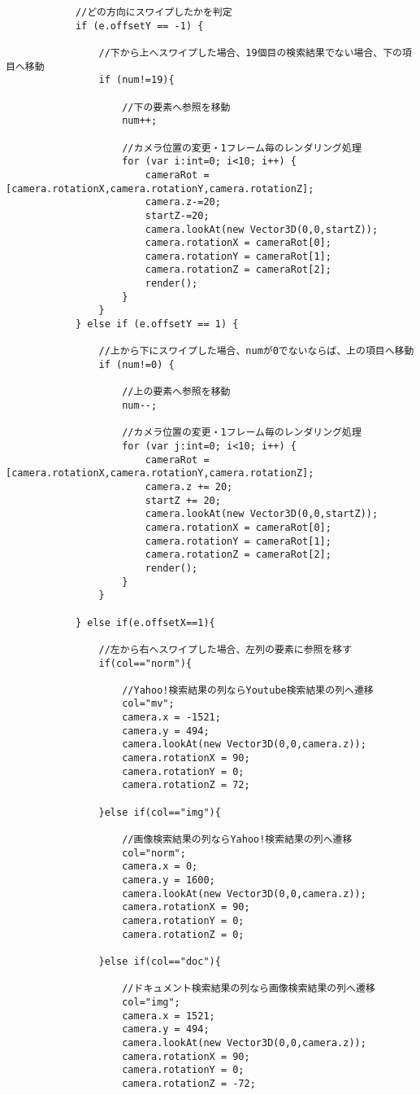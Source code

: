 {\begin{verbatim}
			//どの方向にスワイプしたかを判定
			if (e.offsetY == -1) {
				
				//下から上へスワイプした場合、19個目の検索結果でない場合、下の項目へ移動
				if (num!=19){
					
					//下の要素へ参照を移動
					num++;
					
					//カメラ位置の変更・1フレーム毎のレンダリング処理
					for (var i:int=0; i<10; i++) {
						cameraRot = [camera.rotationX,camera.rotationY,camera.rotationZ];
						camera.z-=20;
						startZ-=20;
						camera.lookAt(new Vector3D(0,0,startZ));
						camera.rotationX = cameraRot[0];
						camera.rotationY = cameraRot[1];
						camera.rotationZ = cameraRot[2];
						render();
					}
				}
			} else if (e.offsetY == 1) {
				
				//上から下にスワイプした場合、numが0でないならば、上の項目へ移動
				if (num!=0) {
					
					//上の要素へ参照を移動
					num--;
					
					//カメラ位置の変更・1フレーム毎のレンダリング処理
					for (var j:int=0; i<10; i++) {
						cameraRot = [camera.rotationX,camera.rotationY,camera.rotationZ];
						camera.z += 20;
						startZ += 20;
						camera.lookAt(new Vector3D(0,0,startZ));
						camera.rotationX = cameraRot[0];
						camera.rotationY = cameraRot[1];
						camera.rotationZ = cameraRot[2];
						render();
					}
				}
				
			} else if(e.offsetX==1){
				
				//左から右へスワイプした場合、左列の要素に参照を移す
				if(col=="norm"){
					
					//Yahoo!検索結果の列ならYoutube検索結果の列へ遷移
					col="mv";
					camera.x = -1521;
					camera.y = 494;
					camera.lookAt(new Vector3D(0,0,camera.z));
					camera.rotationX = 90;
					camera.rotationY = 0;
					camera.rotationZ = 72;
				
				}else if(col=="img"){
					
					//画像検索結果の列ならYahoo!検索結果の列へ遷移
					col="norm";
					camera.x = 0;
					camera.y = 1600;
					camera.lookAt(new Vector3D(0,0,camera.z));
					camera.rotationX = 90;
					camera.rotationY = 0;
					camera.rotationZ = 0;
				
				}else if(col=="doc"){
					
					//ドキュメント検索結果の列なら画像検索結果の列へ遷移
					col="img";
					camera.x = 1521;
					camera.y = 494;
					camera.lookAt(new Vector3D(0,0,camera.z));
					camera.rotationX = 90;
					camera.rotationY = 0;
					camera.rotationZ = -72;
					

\end{verbatim}}
